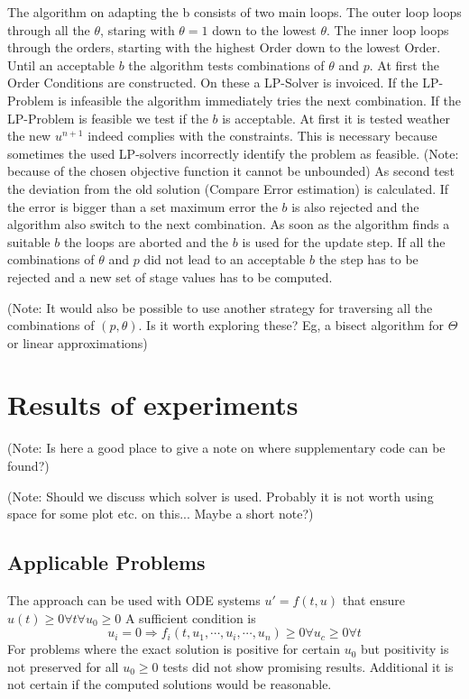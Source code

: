 \documentclass[a4paper]{scrartcl}
\numberwithin{equation}{section}
\theoremstyle{plain}
\theoremstyle{definition}
\numberwithin{theorem}{section}
\newcommand{\1}{\mathbbm{1}}
\begin{document}
The algorithm on adapting the b consists of two main loops. The outer loop loops through all the $\theta$, staring with $\theta = 1$ down to the lowest $\theta$. The inner loop loops through the orders, starting with the highest Order down to the lowest Order. 
Until an acceptable $b$ the algorithm tests combinations of $\theta$ and $p$. At first the Order Conditions are constructed. On these a LP-Solver is invoiced. If the LP-Problem is infeasible the algorithm immediately tries the next combination. If the LP-Problem is feasible we test if the $b$ is acceptable. At first it is tested weather the new $u^{n+1}$ indeed complies with the constraints. This is necessary because sometimes the used LP-solvers incorrectly identify the problem as feasible. (Note: because of the chosen objective function it cannot be unbounded) As second test the deviation from the old solution (Compare Error estimation) is calculated. If the error is bigger than a set maximum error the $b$ is also rejected and the algorithm also switch to the next combination.
As soon as the algorithm finds a suitable $b$ the loops are aborted and the $b$ is used for the update step.
If all the combinations of $\theta$ and $p$ did not lead to an acceptable $b$ the step has to be rejected and a new set of stage values has to be computed.

(Note: It would also be possible to use another strategy for traversing all the combinations of $(p,\theta)$. Is it worth exploring these? Eg, a bisect algorithm for $\Theta$ or linear approximations)


\section{Results of experiments}\label{sec:Numeric_Results}

(Note: Is here a good place to give a note on where supplementary code can be found?)

(Note: Should we discuss which solver is used. Probably it is not worth using space for some plot etc. on this... Maybe a short note?)

\subsection{Applicable Problems}\label{sec:app_problem}
The approach can be used with ODE systems $u' = f(t,u)$ that ensure  $u(t) \geq 0 \forall t \forall {  u_0 \geq 0}$ 
A sufficient condition is  
\begin{equation}
u_i=0 \Rightarrow f_i(t,u_1,\cdots,u_i,\cdots,u_n) \geq 0  \forall {u_c \geq 0} \forall {t}
\end{equation}
For problems where the exact solution is positive for certain $u_0$ but positivity is not preserved for all $u_0 \geq 0$ tests did not show promising results. Additional it is not certain if the computed solutions would be reasonable.
\end{document}
